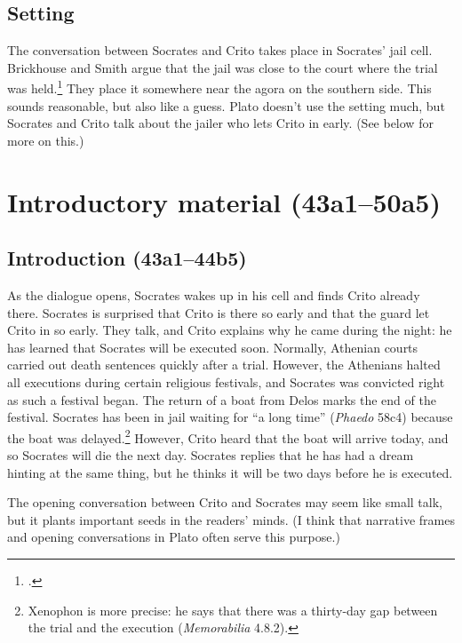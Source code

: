 \documentclass[12pt,letterpaper]{article}
\begin{document}
\subsection*{Setting}

The conversation between Socrates and Crito takes place in Socrates' jail cell. Brickhouse and Smith argue that the jail was close to the court where the trial was held.\footcite[][197]{brickhouse-smith2004-plato-trial-of-socrates} They place it somewhere near the agora on the southern side. This sounds reasonable, but also like a guess. Plato doesn't use the setting much, but Socrates and Crito talk about the jailer who lets Crito in early. (See below for more on this.)


\section*{Introductory material (43a1--50a5)}

\subsection*{Introduction (43a1--44b5)}

As the dialogue opens, Socrates wakes up in his cell and finds Crito already there. Socrates is surprised that Crito is there so early and that the guard let Crito in so early. They talk, and Crito explains why he came during the night: he has learned that Socrates will be executed soon. Normally, Athenian courts carried out death sentences quickly after a trial. However, the Athenians halted all executions during certain religious festivals, and Socrates was convicted right as such a festival began. The return of a boat from Delos marks the end of the festival. Socrates has been in jail waiting for ``a long time'' (\textit{Phaedo} 58c4) because the boat was delayed.\footnote{Xenophon is more precise: he says that there was a thirty-day gap between the trial and the execution (\textit{Memorabilia} 4.8.2).} However, Crito heard that the boat will arrive today, and so Socrates will die the next day. Socrates replies that he has had a dream hinting at the same thing, but he thinks it will be two days before he is executed.

The opening conversation between Crito and Socrates may seem like small talk, but it plants important seeds in the readers' minds. (I think that narrative frames and opening conversations in Plato often serve this purpose.)
\end{document}
